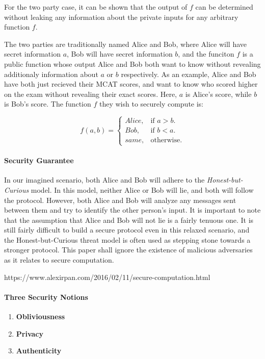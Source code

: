 For the two party case, it can be shown that the output of $f$ can be determined without leaking any information about the private inputs for any arbitrary function $f$.

The two parties are traditionally named Alice and Bob, where Alice will have secret information $a$, Bob will have secret information $b$, and the funciton $f$ is a public function whose output Alice and Bob both want to know without revealing additionaly information about $a$ or $b$ respectively. As an example, Alice and Bob have both just recieved their MCAT scores, and want to know who scored higher on the exam without revealing their exact scores. Here, $a$ is Alice's score, while $b$ is Bob's score. The function $f$ they wish to securely compute is:  

\begin{equation}
f(a,b)= \begin{cases}
Alice, & \text{if $a > b$}.\\
Bob, & \text{if $b < a$}.\\
same, & \text{otherwise}.
\end{cases}
\end{equation}

\paragraph{Security Guarantee}
In our imagined scenario, both Alice and Bob will adhere to the \textit{Honest-but-Curious} model. In this model, neither Alice or Bob will lie, and both will follow the protocol. However, both Alice and Bob will analyze any messages sent between them and try to identify the other person's input.
It is important to note that the assumption that Alice and Bob will not lie is a fairly tenuous one. It is still fairly difficult to build a secure protocol even in this relaxed scenario, and the Honest-but-Curious threat model is often used as stepping stone towards a stronger protocol. This paper shall ignore the existence of malicious adversaries as it relates to secure computation.

https://www.alexirpan.com/2016/02/11/secure-computation.html

\paragraph{Three Security Notions}

\begin{enumerate}
\item \textbf{Obliviousness}
\item \textbf{Privacy}
\item \textbf{Authenticity}
\end{enumerate}

